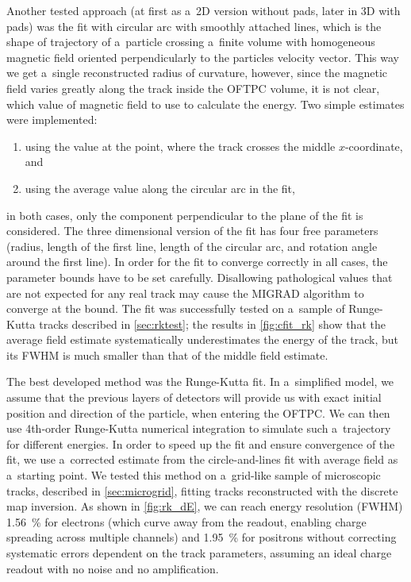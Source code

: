 		Another tested approach (at first as a~2D version without pads, later in 3D with pads) was the fit with circular arc with smoothly attached lines, which is the shape of trajectory of a~particle crossing a~finite volume with homogeneous magnetic field oriented perpendicularly to the particles velocity vector. This way we get a~single reconstructed radius of curvature, however, since the magnetic field varies greatly along the track inside the \ac{OFTPC} volume, it is not clear, which value of magnetic field to use to calculate the energy. Two simple estimates were implemented:
		\begin{enumerate}[nosep]
			\item using the value at the point, where the track crosses the middle $x$\nobreakdash-coordinate, and
			\item using the average value along the circular arc in the fit,
		\end{enumerate}
		in both cases, only the component perpendicular to the plane of the fit is considered. The three dimensional version of the fit has four free parameters (radius, length of the first line, length of the circular arc, and rotation angle around the first line). In order for the fit to converge correctly in all cases, the parameter bounds have to be set carefully. Disallowing pathological values that are not expected for any real track may cause the MIGRAD algorithm to converge at the bound. The fit was successfully tested on a~sample of Runge-Kutta tracks described in \cref{sec:rktest}; the results in \cref{fig:cfit_rk} show that the average field estimate systematically underestimates the energy of the track, but its \acs{FWHM} is much smaller than that of the middle field estimate.
		
		The best developed method was the Runge-Kutta fit. In a~simplified model, we assume that the previous layers of detectors will provide us with exact initial position and direction of the particle, when entering the \ac{OFTPC}. We can then use 4th\nobreakdash-order Runge-Kutta numerical integration to simulate such a~trajectory for different energies. In order to speed up the fit and ensure convergence of the fit, we use a~corrected estimate from the circle-and-lines fit with average field as a~starting point. We tested this method on a~grid-like sample of microscopic tracks, described in \cref{sec:microgrid}, fitting tracks reconstructed with the discrete map inversion. As shown in \cref{fig:rk_dE}, we can reach energy resolution (\acs{FWHM}) \qty{1.56}{\percent} for electrons (which curve away from the readout, enabling charge spreading across multiple channels) and \qty{1.95}{\percent} for positrons without correcting systematic errors dependent on the track parameters, assuming an ideal charge readout with no noise and no amplification.
		
